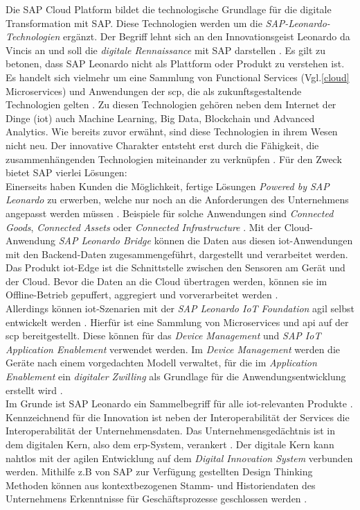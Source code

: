 Die SAP Cloud Platform bildet die technologische Grundlage für die digitale Transformation mit SAP. Diese Technologien werden um die \textit{SAP-Leonardo-Technologien} ergänzt. Der Begriff lehnt sich an den Innovationsgeist Leonardo da Vincis an und soll die \textit{digitale Rennaissance} mit SAP  darstellen \citep{Howells2017}. Es gilt zu betonen, dass SAP Leonardo nicht als Plattform oder Produkt zu verstehen ist. Es handelt sich vielmehr um eine Sammlung von Functional Services (Vgl.\ref{cloud} Microservices) und Anwendungen der \ac{scp}, die als zukunftsgestaltende Technologien gelten \citep{Elsner2018}. Zu diesen Technologien gehören neben dem Internet der Dinge (\acf{iot}) auch Machine Learning, Big Data, Blockchain und Advanced Analytics. Wie bereits zuvor erwähnt, sind diese Technologien in ihrem Wesen nicht neu. Der innovative Charakter entsteht erst durch die Fähigkeit, die zusammenhängenden Technologien miteinander zu verknüpfen \citep{Utecht2018}. Für den Zweck bietet SAP vierlei Lösungen:
 \\Einerseits haben Kunden die Möglichkeit, fertige Lösungen \textit{Powered by SAP Leonardo} zu erwerben, welche nur noch an die Anforderungen des Unternehmens angepasst werden müssen \citep{Utecht2018}. Beispiele für solche Anwendungen sind \textit{Connected Goods}, \textit{Connected Assets} oder \textit{Connected Infrastructure} \citep{Elsner2018}. Mit der Cloud-Anwendung \textit{SAP Leonardo Bridge} können die Daten aus diesen \ac{iot}-Anwendungen mit den Backend-Daten zugesammengeführt, dargestellt und verarbeitet werden. Das Produkt \ac{iot}-Edge ist die Schnittstelle zwischen den Sensoren am Gerät und der Cloud. Bevor die Daten an die Cloud übertragen werden, können sie im Offline-Betrieb gepuffert, aggregiert und vorverarbeitet werden \citep{Utecht2018}.
\\Allerdings können \ac{iot}-Szenarien mit der \textit{SAP Leonardo IoT Foundation} agil selbst entwickelt werden \citep{Elsner2018}. Hierfür ist eine Sammlung von Microservices und \ac{api} auf der \ac{scp} bereitgestellt. Diese können für das \textit{Device Management} und \textit{SAP IoT Application Enablement} verwendet werden. Im \textit{Device Management} werden die Geräte nach einem vorgedachten Modell verwaltet, für die im \textit{Application Enablement} ein \textit{digitaler Zwilling} als Grundlage für die Anwendungsentwicklung erstellt wird \citep{Elsner2018}.
\\Im Grunde ist SAP Leonardo ein Sammelbegriff für alle \ac{iot}-relevanten Produkte \citep{Utecht2018}. Kennzeichnend für die Innovation ist neben der Interoperabilität der Services die Interoperabilität der Unternehmensdaten. Das Unternehmensgedächtnis ist in dem digitalen Kern, also dem \ac{erp}-System, verankert \citep{Elsner2018}. Der digitale Kern kann nahtlos mit der agilen Entwicklung auf dem \textit{Digital Innovation System} verbunden werden. Mithilfe  z.B von SAP zur Verfügung gestellten Design Thinking Methoden können aus kontextbezogenen Stamm- und Historiendaten des Unternehmens Erkenntnisse für Geschäftsprozesse geschlossen werden \citep{Elsner2018}.

